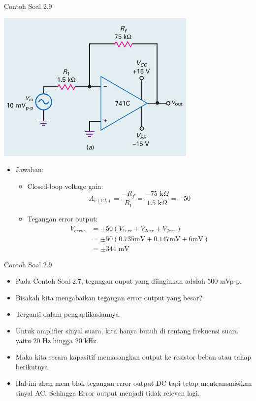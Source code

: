 \begin{frame}[t]{Contoh Soal 2.9}
	\begin{multicols}{2}
		\begin{center}
			\includegraphics[width=\linewidth]{gambar/fig-16.17a}
		\end{center}
		\columnbreak
		\begin{itemize}
			\item Jawaban:
			\begin{itemize}
				\item Closed-loop voltage gain:
				\[ A_{v(CL)} = \frac{-R_f}{R_1} = \frac{-75 \text{ k}\Omega}{1.5 \text{ k}\Omega} = -50\]
				\item Tegangan error output:
				\begin{align*}
					V_{error} &= \pm 50 (V_{1err} + V_{2err} + V_{2err}) \\
					&= \pm 50 (0.735 \text{mV} + 0.147 \text{mV} + 6 \text{mV}) \\
					&= \pm 344 \text{ mV}
				\end{align*}
			\end{itemize}
		\end{itemize}
	\end{multicols}
\end{frame}

\begin{frame}[t]{Contoh Soal 2.9}
	\begin{itemize}
		\item Pada Contoh Soal 2.7, tegangan ouput yang diinginkan adalah 500 mVp-p.
		\item Bisakah kita mengabaikan tegangan error output yang besar?
		\item Terganti dalam pengaplikasiannya.
		\item Untuk amplifier sinyal suara, kita hanya butuh di rentang frekuensi suara yaitu 20 Hz hingga 20 kHz.
		\item Maka kita secara kapasitif memasangkan output ke resistor beban atau tahap berikutnya.
		\item Hal ini akan mem-blok tegangan error output DC tapi tetap mentransmisikan sinyal AC. Sehingga Error output menjadi tidak relevan lagi.
	\end{itemize}
\end{frame}

